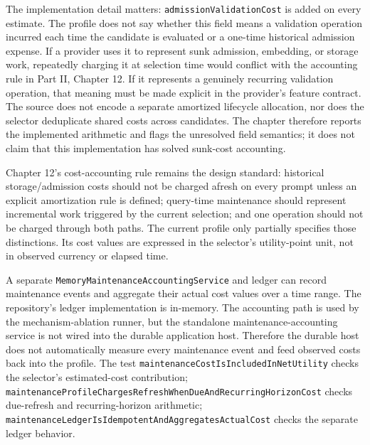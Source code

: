 The implementation detail matters: \texttt{admission\allowbreak{}Validation\allowbreak{}Cost} is added on every estimate. The profile does not say whether this field means a validation operation incurred each time the candidate is evaluated or a one-time historical admission expense. If a provider uses it to represent sunk admission, embedding, or storage work, repeatedly charging it at selection time would conflict with the accounting rule in Part II, Chapter 12. If it represents a genuinely recurring validation operation, that meaning must be made explicit in the provider's feature contract. The source does not encode a separate amortized lifecycle allocation, nor does the selector deduplicate shared costs across candidates. The chapter therefore reports the implemented arithmetic and flags the unresolved field semantics; it does not claim that this implementation has solved sunk-cost accounting.

Chapter 12's cost-accounting rule remains the design standard: historical storage/admission costs should not be charged afresh on every prompt unless an explicit amortization rule is defined; query-time maintenance should represent incremental work triggered by the current selection; and one operation should not be charged through both paths. The current profile only partially specifies those distinctions. Its cost values are expressed in the selector's utility-point unit, not in observed currency or elapsed time.

A separate \texttt{Memory\allowbreak{}Maintenance\allowbreak{}Accounting\allowbreak{}Service} and ledger can record maintenance events and aggregate their actual cost values over a time range. The repository's ledger implementation is in-memory. The accounting path is used by the mechanism-ablation runner, but the standalone maintenance-accounting service is not wired into the durable application host. Therefore the durable host does not automatically measure every maintenance event and feed observed costs back into the profile. The test \texttt{maintenance\allowbreak{}Cost\allowbreak{}Is\allowbreak{}Included\allowbreak{}In\allowbreak{}Net\allowbreak{}Utility} checks the selector's estimated-cost contribution; \texttt{maintenance\allowbreak{}Profile\allowbreak{}Charges\allowbreak{}Refresh\allowbreak{}When\allowbreak{}Due\allowbreak{}And\allowbreak{}Recurring\allowbreak{}Horizon\allowbreak{}Cost} checks due-refresh and recurring-horizon arithmetic; \texttt{maintenance\allowbreak{}Ledger\allowbreak{}Is\allowbreak{}Idempotent\allowbreak{}And\allowbreak{}Aggregates\allowbreak{}Actual\allowbreak{}Cost} checks the separate ledger behavior.


